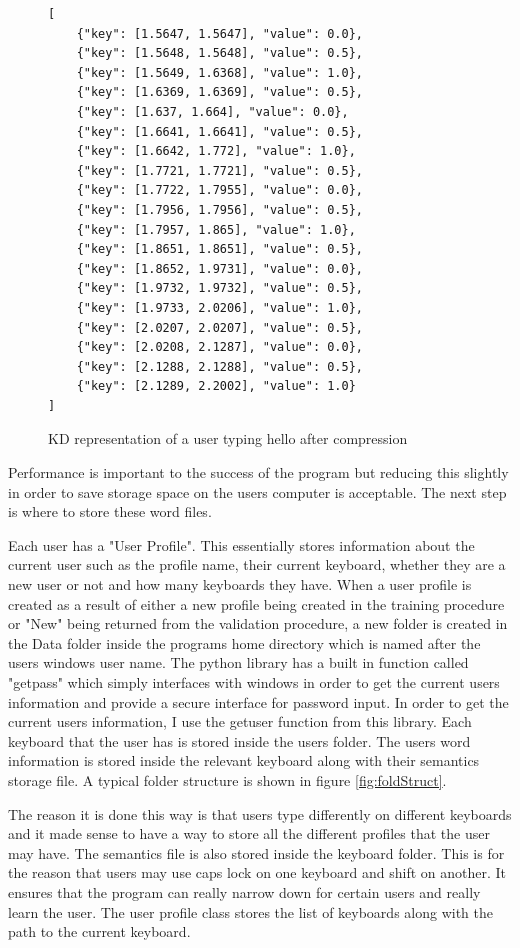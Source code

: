 \documentclass[10pt,a4paper]{report}
\begin{document}
\begin{figure}[h!]
	\begin{lstlisting}
[
    {"key": [1.5647, 1.5647], "value": 0.0}, 
    {"key": [1.5648, 1.5648], "value": 0.5}, 
    {"key": [1.5649, 1.6368], "value": 1.0}, 
    {"key": [1.6369, 1.6369], "value": 0.5},
    {"key": [1.637, 1.664], "value": 0.0}, 
    {"key": [1.6641, 1.6641], "value": 0.5}, 
    {"key": [1.6642, 1.772], "value": 1.0}, 
    {"key": [1.7721, 1.7721], "value": 0.5}, 
    {"key": [1.7722, 1.7955], "value": 0.0}, 
    {"key": [1.7956, 1.7956], "value": 0.5}, 
    {"key": [1.7957, 1.865], "value": 1.0},
    {"key": [1.8651, 1.8651], "value": 0.5}, 
    {"key": [1.8652, 1.9731], "value": 0.0}, 
    {"key": [1.9732, 1.9732], "value": 0.5}, 
    {"key": [1.9733, 2.0206], "value": 1.0}, 
    {"key": [2.0207, 2.0207], "value": 0.5}, 
    {"key": [2.0208, 2.1287], "value": 0.0}, 
    {"key": [2.1288, 2.1288], "value": 0.5}, 
    {"key": [2.1289, 2.2002], "value": 1.0}
]
	\end{lstlisting}
	\caption{KD representation of a user typing hello after compression}
	\label{fig:compression}
\end{figure}

Performance is important to the success of the program but reducing this slightly in order to save storage space on the users computer is acceptable. The next step is where to store these word files.

Each user has a "User Profile". This essentially stores information about the current user such as the profile name, their current keyboard, whether they are a new user or not and how many keyboards they have. When a user profile is created as a result of either a new profile being created in the training procedure or "New" being returned from the validation procedure, a new folder is created in the Data folder inside the programs home directory which is named after the users windows user name. The python library has a built in function called "getpass" which simply interfaces with windows in order to get the current users information and provide a secure interface for password input\cite{getuser}. In order to get the current users information, I use the getuser function from this library. Each keyboard that the user has is stored inside the users folder. The users word information is stored inside the relevant keyboard along with their semantics storage file. A typical folder structure is shown in figure \ref{fig:foldStruct}.

The reason it is done this way is that users type differently on different keyboards and it made sense to have a way to store all the different profiles that the user may have. The semantics file is also stored inside the keyboard folder. This is for the reason that users may use caps lock on one keyboard and shift on another. It ensures that the program can really narrow down for certain users and really learn the user. The user profile class stores the list of keyboards along with the path to the current keyboard.
\end{document}
